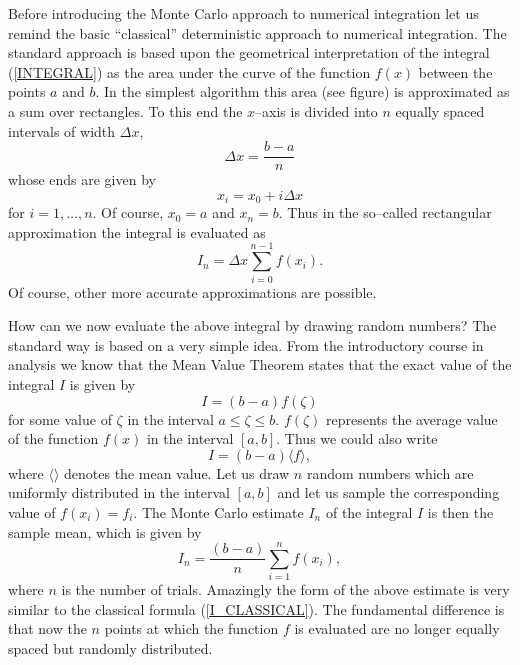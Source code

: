 Before introducing the Monte Carlo approach to numerical integration
let us remind the basic ``classical'' deterministic approach to
numerical integration. The standard approach is based upon the
geometrical interpretation of the integral (\ref{INTEGRAL}) as the
area under the curve of the function $f(x)$ between the points $a$ and
$b$. In the simplest algorithm this area (see figure) is approximated
as a sum over rectangles. To this end the $x$--axis is divided into
$n$ equally spaced intervals of width $\Delta x$,
\begin{equation}
\Delta x = \frac{b-a}{n}
\end{equation}
whose ends are given by
\begin{equation}
x_i = x_0 + i\Delta x
\end{equation}
for $i=1, \ldots ,n$. Of course, $x_0 = a$ and $x_n =b$. Thus in the
so--called rectangular approximation the integral is evaluated as
\begin{equation}
\label{I_CLASSICAL}
I_n = \Delta x \sum_{i=0}^{n-1} f(x_i).
\end{equation}
Of course, other more accurate approximations are possible.

How can we now evaluate the above integral by drawing random numbers?
The standard way is based on a very simple idea. 
From the introductory course in analysis we know that the Mean 
Value Theorem states that the exact value of the integral $I$ is 
given by
\begin{equation}
I= (b-a) f(\zeta)
\end{equation}
for some value of $\zeta$ in the interval $a \le \zeta \le b$. $f(\zeta)$
represents the average value of the function $f(x)$ 
in the interval $[a,b]$. Thus we could also write
\begin{equation}
I = (b-a) \langle f \rangle,
\end{equation}
where $\langle  \rangle$ denotes the mean value.
Let us draw $n$
random numbers which are uniformly distributed in the interval $[a,b]$
and let us sample the corresponding value of $f(x_i)=f_i$. The Monte Carlo
estimate $I_n$ of the integral $I$ is then the sample mean, which is
given by
\begin{equation}
\label{MCI_STANDARD}
I_n = \frac{(b-a)}{n} \sum_{i=1}^{n} f(x_i),
\end{equation}
where $n$ is the number of trials. Amazingly the form of the above
estimate is very similar to the classical formula (\ref{I_CLASSICAL}).
The fundamental difference is that now the $n$ points at which the
function $f$ is evaluated are no longer equally spaced but randomly 
distributed.

